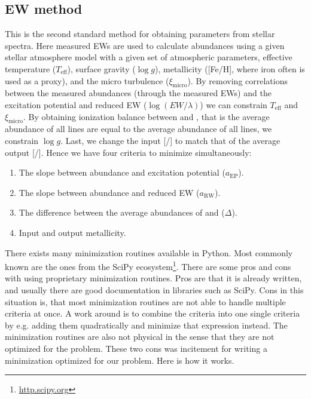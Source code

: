 \documentclass{aa}
\begin{document}
\subsection{EW method}
\label{sub:EW_method}
This is the second standard method for obtaining parameters from stellar
spectra. Here measured EWs are used to calculate abundances using a given
stellar atmosphere model with a given set of atmospheric parameters,
effective temperature ($T_\mathrm{eff}$), surface gravity ($\log g$),
metallicity ([Fe/H], where iron often is used as a proxy), and the micro
turbulence ($\xi_\mathrm{micro}$). By removing correlations between the measured
abundances (through the measured EWs) and the excitation potential and reduced
EW ($\log(EW/\lambda)$) we can constrain $T_\mathrm{eff}$ and $\xi_\mathrm{micro}$. By
obtaining ionization balance between  and , that is
the average abundance of all  lines are equal to the average
abundance of all  lines, we constrain $\log g$. Last, we change
the input [/] to match that of the average output
[/]. Hence we have four criteria to minimize simultaneously:

\begin{enumerate}
    \item The slope between abundance and excitation potential ($a_\mathrm{EP}$).
    \item The slope between abundance and reduced EW ($a_\mathrm{RW}$).
    \item The difference between the average abundances of  and
           ($\Delta$).
    \item Input and output metallicity.
\end{enumerate}

There exists many minimization routines available in Python. Most commonly
known are the ones from the SciPy ecosystem\footnote{\url{http.scipy.org}}.
There are some pros and cons with using proprietary minimization routines.
Pros are that it is already written, and usually there are good documentation
in libraries such as SciPy. Cons in this situation is, that most minimization
routines are not able to handle multiple criteria at once. A work around is
to combine the criteria into one single criteria by e.g. adding them
quadratically and minimize that expression instead. The minimization routines
are also not physical in the sense that they are not optimized for the problem.
These two cons was incitement for writing a minimization optimized for our
problem. Here is how it works.
\end{document}
